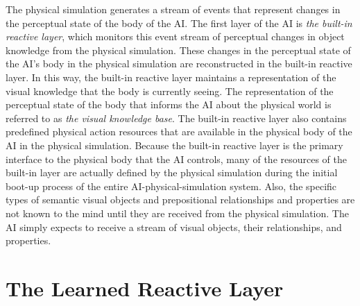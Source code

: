 The physical simulation generates a stream of events that represent
changes in the perceptual state of the body of the AI.  The first
layer of the AI is \emph{the built-in reactive layer}, which monitors
this event stream of perceptual changes in object knowledge from the
physical simulation.  These changes in the perceptual state of the
AI's body in the physical simulation are reconstructed in the built-in
reactive layer.  In this way, the built-in reactive layer maintains a
representation of the visual knowledge that the body is currently
seeing.  The representation of the perceptual state of the body that
informs the AI about the physical world is referred to as \emph{the
  visual knowledge base}.  The built-in reactive layer also contains
predefined physical action resources that are available in the
physical body of the AI in the physical simulation.  Because the
built-in reactive layer is the primary interface to the physical body
that the AI controls, many of the resources of the built-in layer are
actually defined by the physical simulation during the initial boot-up
process of the entire AI-physical-simulation system.  Also, the
specific types of semantic visual objects and prepositional
relationships and properties are not known to the mind until they are
received from the physical simulation.  The AI simply expects to
receive a stream of visual objects, their relationships, and
properties.

\section{The Learned Reactive Layer}

